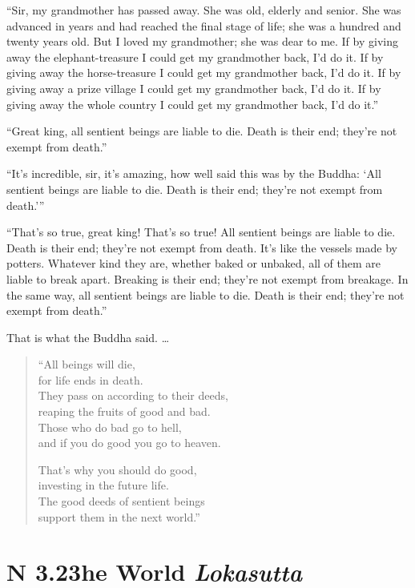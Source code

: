 \documentclass[12pt,openany]{book}%
\newcommand*{\suttatitleacronym}[1]{\smaller[2]{#1}\vspace*{.3em}}
\newcommand*{\suttatitletranslation}[1]{\linebreak{#1}}
\newcommand*{\suttatitleroot}[1]{\linebreak\smaller[2]\itshape{#1}}
\newcommand*{\tocacronym}[1]{\hspace*{-3.3em}{#1}\quad}
\newcommand*{\toctranslation}[1]{#1}
\newcommand*{\tocroot}[1]{(\textit{#1})}
\begin{document}
“Sir, my grandmother has passed away. She was old, elderly and senior. She was advanced in years and had reached the final stage of life; she was a hundred and twenty years old. But I loved my grandmother; she was dear to me. If by giving away the elephant-treasure I could get my grandmother back, I’d do it. If by giving away the horse-treasure I could get my grandmother back, I’d do it. If by giving away a prize village I could get my grandmother back, I’d do it. If by giving away the whole country I could get my grandmother back, I’d do it.” 

“Great king, all sentient beings are liable to die. Death is their end; they’re not exempt from death.” 

“It’s incredible, sir, it’s amazing, how well said this was by the Buddha: ‘All sentient beings are liable to die. Death is their end; they’re not exempt from death.’” 

“That’s so true, great king! That’s so true! All sentient beings are liable to die. Death is their end; they’re not exempt from death. It’s like the vessels made by potters. Whatever kind they are, whether baked or unbaked, all of them are liable to break apart. Breaking is their end; they’re not exempt from breakage. In the same way, all sentient beings are liable to die. Death is their end; they’re not exempt from death.” 

That is what the Buddha said. … 

\begin{verse}%
“All beings will die, \\
for life ends in death. \\
They pass on according to their deeds, \\
reaping the fruits of good and bad. \\
Those who do bad go to hell, \\
and if you do good you go to heaven. 

That’s why you should do good, \\
investing in the future life. \\
The good deeds of sentient beings \\
support them in the next world.” 

%
\end{verse}

%
\section*{{\suttatitleacronym SN 3.23}{\suttatitletranslation The World }{\suttatitleroot Lokasutta}}
\addcontentsline{toc}{section}{\tocacronym{SN 3.23} \toctranslation{The World } \tocroot{Lokasutta}}
\end{document}
